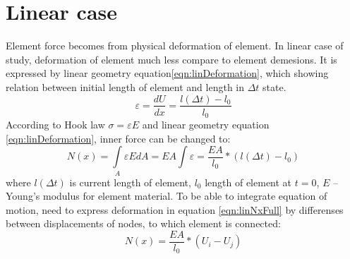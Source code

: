 \documentclass[12pt]{report}
\begin{document}
\section{Linear case}\par Element force becomes from physical deformation of
element. In linear case of study, deformation of element much less compare to
element demesions. It is expressed by linear geometry
equation\eqref{eqn:linDeformation}, which showing relation between initial
length of element and length in $\Delta t$ state.
\begin{equation}\label{eqn:linDeformation}
  \varepsilon=\frac{dU}{dx}=\frac{l(\Delta t)-l_0}{l_0}
\end{equation}
According to Hook law $\sigma=\varepsilon E$ and linear geometry equation
\eqref{eqn:linDeformation}, inner force can be changed to:
\begin{equation}\label{eqn:linNxFull}
  N(x)= \int\limits_A \varepsilon EdA=EA\int \varepsilon=\frac{EA}{l_0}*(l(\Delta t)-l_0)
\end{equation}
where $l(\Delta t)$ is current length of element, $l_0$ length of element at
$t=0$, $E$ – Young’s modulus for element material. To be able to integrate
equation of motion, need to express deformation in equation
\eqref{eqn:linNxFull} by differenses between displacements of nodes, to which
element is connected:
\begin{equation}\label{eqn:linNxWdispl}
  N(x)=\frac{EA}{l_0}*(U_{i}-U_{j})
\end{equation}\par
\end{document}
